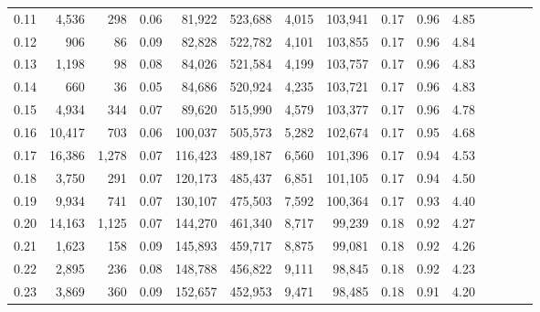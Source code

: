 \begin{tabular}{rrrcrrrrrrrrrrr}
0.11 &   4,536 &    298 &                                       0.06 &   81,922 &  523,688 &    4,015 &  103,941 &  0.17 &  0.96 &                         4.85 \\
0.12 &     906 &     86 &                                       0.09 &   82,828 &  522,782 &    4,101 &  103,855 &  0.17 &  0.96 &                         4.84 \\
0.13 &   1,198 &     98 &                                       0.08 &   84,026 &  521,584 &    4,199 &  103,757 &  0.17 &  0.96 &                         4.83 \\
0.14 &     660 &     36 &                                       0.05 &   84,686 &  520,924 &    4,235 &  103,721 &  0.17 &  0.96 &                         4.83 \\
0.15 &   4,934 &    344 &                                       0.07 &   89,620 &  515,990 &    4,579 &  103,377 &  0.17 &  0.96 &                         4.78 \\
0.16 &  10,417 &    703 &                                       0.06 &  100,037 &  505,573 &    5,282 &  102,674 &  0.17 &  0.95 &                         4.68 \\
0.17 &  16,386 &  1,278 &                                       0.07 &  116,423 &  489,187 &    6,560 &  101,396 &  0.17 &  0.94 &                         4.53 \\
0.18 &   3,750 &    291 &                                       0.07 &  120,173 &  485,437 &    6,851 &  101,105 &  0.17 &  0.94 &                         4.50 \\
0.19 &   9,934 &    741 &                                       0.07 &  130,107 &  475,503 &    7,592 &  100,364 &  0.17 &  0.93 &                         4.40 \\
0.20 &  14,163 &  1,125 &                                       0.07 &  144,270 &  461,340 &    8,717 &   99,239 &  0.18 &  0.92 &                         4.27 \\
0.21 &   1,623 &    158 &                                       0.09 &  145,893 &  459,717 &    8,875 &   99,081 &  0.18 &  0.92 &                         4.26 \\
0.22 &   2,895 &    236 &                                       0.08 &  148,788 &  456,822 &    9,111 &   98,845 &  0.18 &  0.92 &                         4.23 \\
0.23 &   3,869 &    360 &                                       0.09 &  152,657 &  452,953 &    9,471 &   98,485 &  0.18 &  0.91 &                         4.20 \\

\end{tabular}

